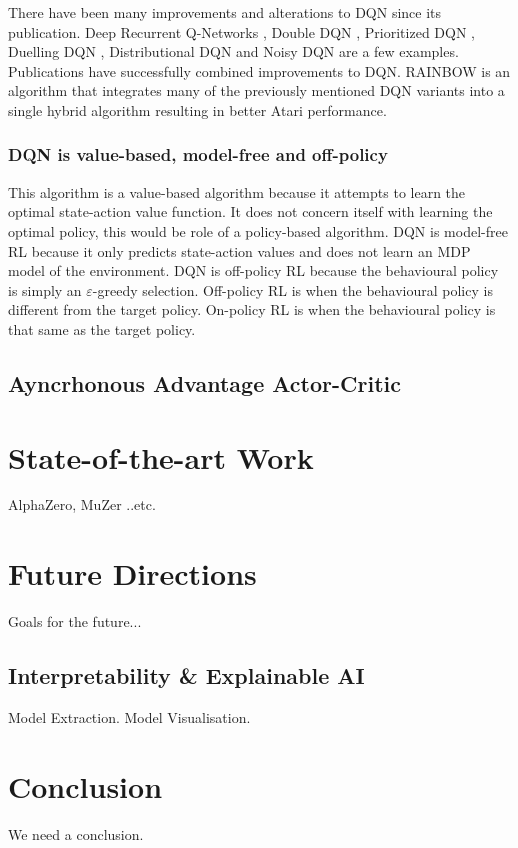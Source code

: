 \documentclass[10pt,journal,compsoc]{IEEEtran}
\begin{document}
There have been many improvements and alterations to DQN since its publication. Deep Recurrent Q-Networks \cite{Haus:DRQN}, Double DQN \cite{van2016ddqn}, Prioritized DQN \cite{schaul2015prioritized}, Duelling DQN \cite{wang2015dueling}, Distributional DQN \cite{bellemare2017distributional} and Noisy DQN \cite{fortunato2017noisy} are a few examples.  Publications have successfully combined improvements to DQN. RAINBOW \cite{hessel2018rainbow} is an algorithm that integrates many of the previously mentioned DQN variants into a single hybrid algorithm resulting in better Atari performance. 
\subsubsection{DQN is value-based, model-free and off-policy}
This algorithm is a value-based algorithm because it attempts to learn the optimal state-action value function. It does not concern itself with learning the optimal policy, this would be role of a policy-based algorithm. DQN is model-free RL because it only predicts state-action values and does not learn an MDP model of the environment. DQN is off-policy RL because the behavioural policy is simply an $\varepsilon$-greedy selection. Off-policy RL is when the behavioural policy is different from the target policy. On-policy RL is when the behavioural policy is that same as the target policy. 
\subsection{Ayncrhonous Advantage Actor-Critic}

\section{State-of-the-art Work}
AlphaZero, MuZer ..etc.

\section{Future Directions}
Goals for the future...
\subsection{Interpretability \& Explainable AI}
Model Extraction.
Model Visualisation.

\section{Conclusion}
We need a conclusion.
\end{document}
